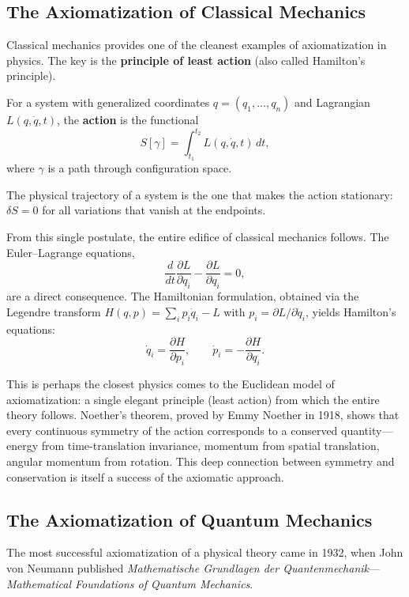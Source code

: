 \subsection{The Axiomatization of Classical Mechanics}

Classical mechanics provides one of the cleanest examples of axiomatization in physics. The key is the \textbf{principle of least action} (also called Hamilton's principle).

\begin{definition}[Action]
For a system with generalized coordinates $q = (q_1, \ldots, q_n)$ and Lagrangian $L(q, \dot{q}, t)$, the \textbf{action} is the functional
\[
S[\gamma] = \int_{t_1}^{t_2} L(q, \dot{q}, t) \, dt,
\]
where $\gamma$ is a path through configuration space.
\end{definition}

\begin{theorem}
The physical trajectory of a system is the one that makes the action stationary: $\delta S = 0$ for all variations that vanish at the endpoints.
\end{theorem}

From this single postulate, the entire edifice of classical mechanics follows. The Euler--Lagrange equations,
\[
\frac{d}{dt}\frac{\partial L}{\partial \dot{q}_i} - \frac{\partial L}{\partial q_i} = 0,
\]
are a direct consequence. The Hamiltonian formulation, obtained via the Legendre transform $H(q,p) = \sum_i p_i \dot{q}_i - L$ with $p_i = \partial L / \partial \dot{q}_i$, yields Hamilton's equations:
\[
\dot{q}_i = \frac{\partial H}{\partial p_i}, \qquad \dot{p}_i = -\frac{\partial H}{\partial q_i}.
\]

This is perhaps the closest physics comes to the Euclidean model of axiomatization: a single elegant principle (least action) from which the entire theory follows. Noether's theorem, proved by Emmy Noether in 1918, shows that every continuous symmetry of the action corresponds to a conserved quantity---energy from time-translation invariance, momentum from spatial translation, angular momentum from rotation. This deep connection between symmetry and conservation is itself a success of the axiomatic approach.

\subsection{The Axiomatization of Quantum Mechanics}

The most successful axiomatization of a physical theory came in 1932, when John von Neumann published \emph{Mathematische Grundlagen der Quantenmechanik}---\emph{Mathematical Foundations of Quantum Mechanics}.

